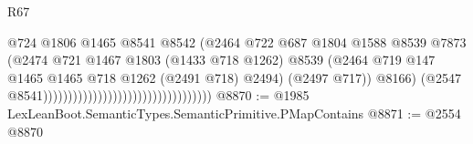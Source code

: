 \begin{lexlean}{R67}
\begin{coremodule}
                                                                      @724
                                                                      @1806
                                                                      @1465
                                                                      @8541
                                                                      @8542
                                                                      (@2464
                                                                        @722
                                                                        @687
                                                                        @1804
                                                                        @1588
                                                                        @8539
                                                                        @7873
                                                                        (@2474
                                                                          @721
                                                                          @1467
                                                                          @1803
                                                                          (@1433 @718 @1262)
                                                                          @8539
                                                                          (@2464
                                                                            @719
                                                                            @147
                                                                            @1465
                                                                            @1465
                                                                            @718
                                                                            @1262
                                                                            (@2491 @718)
                                                                            @2494)
                                                                          (@2497 @717))
                                                                        @8166)
                                                                      (@2547
                                                                        @8541))))))))))))))))))))))))))))))))))
@8870 := @1985 LexLeanBoot.SemanticTypes.SemanticPrimitive.PMapContains
@8871 := @2554 @8870

\end{coremodule}
\end{lexlean}
